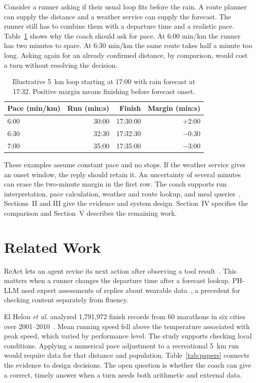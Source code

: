 \documentclass[conference]{IEEEtran}
\begin{document}
Consider a runner asking if their usual loop fits before the rain. A route planner can supply the distance and a weather service can supply the forecast. The runner still has to combine them with a departure time and a realistic pace. Table~\ref{tab:margin} shows why the coach should ask for pace. At 6:00 min/km the runner has two minutes to spare. At 6:30 min/km the same route takes half a minute too long. Asking again for an already confirmed distance, by comparison, would cost a turn without resolving the decision.

\begin{table}[!b]
\caption{Illustrative 5~km loop starting at 17:00 with rain forecast at 17:32. Positive margin means finishing before forecast onset.}
\label{tab:margin}\centering\small
\begin{tabular}{@{}lrrr@{}}\toprule
Pace (min/km) & Run (min:s) & Finish & Margin (min:s)\\\midrule
6:00 & 30:00 & 17:30:00 & $+$2:00\\
6:30 & 32:30 & 17:32:30 & $-$0:30\\
7:00 & 35:00 & 17:35:00 & $-$3:00\\\bottomrule
\end{tabular}
\end{table}
These examples assume constant pace and no stops. If the weather service gives an onset window, the reply should retain it. An uncertainty of several minutes can erase the two-minute margin in the first row.
The coach supports run interpretation, pace calculation, weather and route lookup, and meal queries~\cite{proposal}. Sections~II and III give the evidence and system design. Section~IV specifies the comparison and Section~V describes the remaining work.

\section{Related Work}
ReAct lets an agent revise its next action after observing a tool result~\cite{react}. This matters when a runner changes the departure time after a forecast lookup. PH-LLM used expert assessments of replies about wearable data~\cite{phllm}, a precedent for checking content separately from fluency.

El Helou \emph{et al.} analyzed 1,791,972 finish records from 60 marathons in six cities over 2001--2010~\cite{heat}. Mean running speed fell above the temperature associated with peak speed, which varied by performance level. The study supports checking local conditions. Applying a numerical pace adjustment to a recreational 5~km run would require data for that distance and population. Table~\ref{tab:papers} connects the evidence to design decisions. The open question is whether the coach can give a correct, timely answer when a turn needs both arithmetic and external data.
\end{document}
